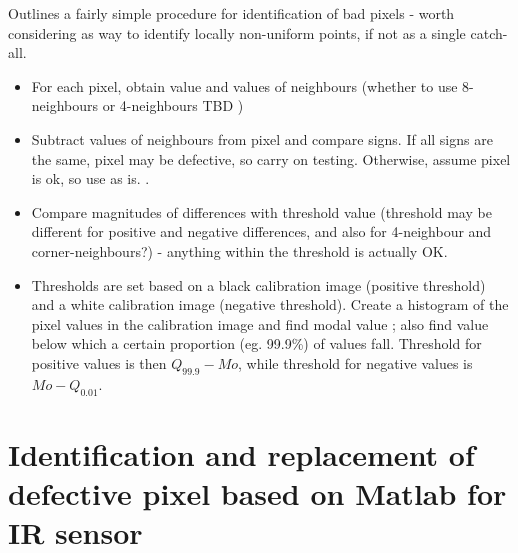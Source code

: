 \documentclass[10pt,fleqn]{article}
\begin{document}
Outlines a fairly simple procedure for identification of bad pixels - worth considering as way to identify locally non-uniform points, if not as a single catch-all.

\begin{itemize}

\item
For each pixel, obtain value and values of neighbours (whether to use 8-neighbours or 4-neighbours TBD )

\item
Subtract values of neighbours from pixel and compare signs.  If all signs are the same, pixel may be defective, so carry on testing. Otherwise, assume pixel is ok, so use as is. .

\item
Compare magnitudes of differences with threshold value (threshold may be different for positive and negative differences, and also for 4-neighbour and corner-neighbours?) - anything within the threshold is actually OK.

\item
Thresholds are set based on a black calibration image (positive threshold) and a white calibration image (negative threshold). Create a histogram of the pixel values in the calibration image and find modal value ; also find value below which a certain proportion (eg. 99.9\%) of values fall. Threshold for positive values is then $Q_{99.9} - Mo$, while threshold for negative values is $Mo - Q_{0.01}$.

\end{itemize}

\section{Identification and replacement of defective pixel based on Matlab for IR sensor \cite{Yang2011}}
\end{document}
